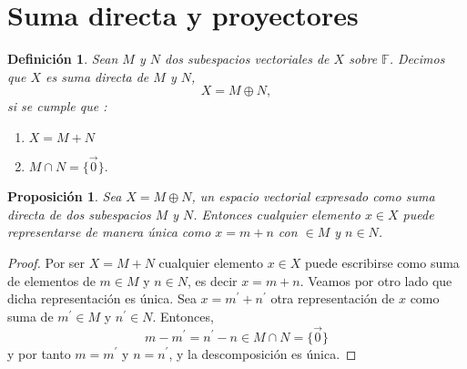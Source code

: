 \documentclass[12pt]{book}
\newtheorem{defn}{\bf Definición}[chapter]
\newtheorem{prop}{\bf Proposición}[chapter]
\begin{document}
 \section{Suma directa y proyectores}
 \begin{defn} Sean $M$ y $N$ dos subespacios vectoriales de $X$ sobre $\mathbb{F}$. Decimos 
que $X$ es suma directa de $M$ y $N$,
 $$X=M\oplus N,$$
 si se cumple que :
 \begin{enumerate}
\item $X=M+N$
\item $M\cap N=\{\vec 0\}.$
\end{enumerate}
\end{defn}
\begin{prop} Sea $X=M\oplus N$, un espacio vectorial expresado como suma directa de dos 
subespacios $M$ y $N$. Entonces cualquier elemento $x\in X$ puede representarse de manera 
\'unica como $x=m+n$ con $\in M$ y $n\in N$.
\end{prop}
\begin{proof}
Por ser $X=M+N$ cualquier elemento $x\in X$ puede escribirse como suma de elementos de $m\in 
M$ y $n\in N$, es decir $x=m+n$. Veamos por otro lado que dicha representaci\'on es \'unica. Sea 
$x=m^\prime +n^\prime$ otra representaci\'on de $x$ como suma de $m^\prime\in M$ y 
$n^\prime\in N$. Entonces,
$$m-m^\prime = n^\prime - n\in M\cap N =\{\vec 0\}$$
y por tanto $m=m^\prime$ y $n=n^\prime$, y la descomposici\'on es \'unica.
\end{proof}
\end{document}
